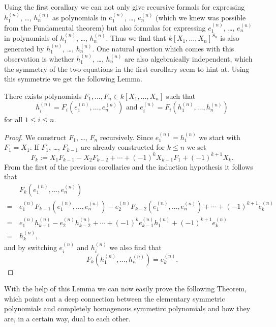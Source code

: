 Using the first corallary we can not only give recursive formals for expressing $h^{(n)}_1$, \dots, $h^{(n)}_n$ as polynomials in $e^{(n)}_1$, \dots, $e^{(n)}_n$ (which we knew was possible from the Fundamental theorem) but also formulas for expressing $e^{(n)}_1$, \dots, $e^{(n)}_n$ in polynomials of $h^{(n)}_1$, \dots, $h^{(n)}_n$. Thus we find that $k[X_1, \dotsc, X_n]^{S_n}$ is also generated by $h^{(n)}_1$, \dots, $h^{(n)}_n$. One natural question which comes with this observation is whether $h^{(n)}_1$, \dots, $h^{(n)}_n$ are also algebraically independent, which the symmetry of the two equations in the first corollary seem to hint at. Using this symmetrie we get the following Lemma.


\begin{lem}
 There exists polynomials $F_1, \dotsc, F_n \in k[X_1, \dotsc, X_n]$ such that
 \[
  h^{(n)}_i = F_i\left(e^{(n)}_1, \dotsc, e^{(n)}_n\right) \text{ and }
  e^{(n)}_i = F_i\left(h^{(n)}_1, \dotsc, h^{(n)}_n\right)
 \]
 for all $1 \leq i \leq n$.
\end{lem}
\begin{proof}
 We construct $F_1$, \dots, $F_n$ recursively. Since $e^{(n)}_1 = h^{(n)}_1$ we start with $F_1 = X_1$. If $F_1$, \dots, $F_{k-1}$ are already constructed for $k \leq n$ we set
 \[
  F_k := X_1 F_{k-1} - X_2 F_{k-2} + \dotsb + (-1)^k X_{k-1} F_1 + (-1)^{k+1} X_k.
 \]
 From the first of the previous corollaries and the induction hypothesis it follows that
 \begin{align*}
   &\, F_k\left(e^{(n)}_1, \dotsc, e^{(n)}_n\right) \\
  =&\, e^{(n)}_1 F_{k-1}\left(e^{(n)}_1, \dotsc, e^{(n)}_n\right) - e^{(n)}_2 F_{k-2}\left(e^{(n)}_1, \dotsc, e^{(n)}_n\right) + \dotsb + (-1)^{k+1} e^{(n)}_k \\
  =&\, e^{(n)}_1 h^{(n)}_{k-1} - e^{(n)}_2 h^{(n)}_{k-2} + \dotsb + (-1)^k e^{(n)}_{k-1} h^{(n)}_1 + (-1)^{k+1} e^{(n)}_k \\
  =&\, h^{(n)}_k,
 \end{align*}
 and by switching $e^{(n)}_i$ and $h^{(n)}_i$ we also find that
 \[
  F_k\left(h^{(n)}_1, \dotsc, h^{(n)}_n\right) = e^{(n)}_k.
 \]
\end{proof}


With the help of this Lemma we can now easily prove the following Theorem, which points out a deep connection between the elementary symmetric polynomials and completely homogenous symmetirc polynomials and how they are, in a certain way, dual to each other.


